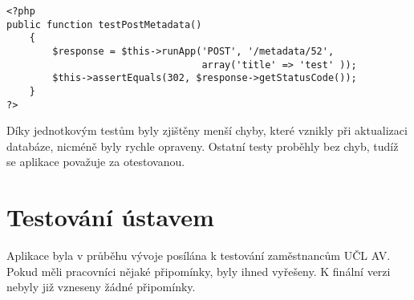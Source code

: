         \pagebreak
        
        \begin{verbatim}
<?php
public function testPostMetadata()
    {
        $response = $this->runApp('POST', '/metadata/52', 
                                  array('title' => 'test' ));
        $this->assertEquals(302, $response->getStatusCode());
    }
?>
        \end{verbatim}
        
        Díky jednotkovým testům byly zjištěny menší chyby, které vznikly při aktualizaci databáze, nicméně byly rychle opraveny. Ostatní testy proběhly bez chyb, tudíž se aplikace považuje za otestovanou.
        
    \section{Testování ústavem}
        Aplikace byla v průběhu vývoje posílána k testování zaměstnancům UČL AV. Pokud měli pracovníci nějaké připomínky, byly ihned vyřešeny. K finální verzi nebyly již vzneseny žádné připomínky.

